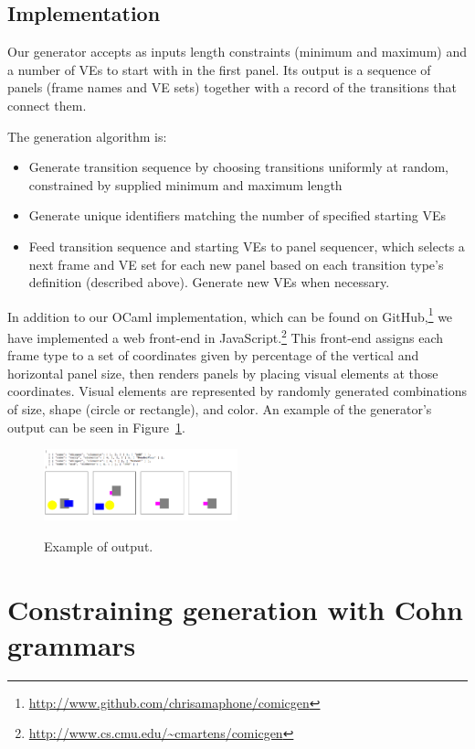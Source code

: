 \subsection{Implementation}

Our generator accepts as inputs length constraints (minimum and maximum)
and a number of VEs to start with in the first panel. Its output is a
sequence of panels (frame names and VE sets) together with a record of the
transitions that connect them.

The generation algorithm is:
\begin{itemize}
\item Generate transition sequence by choosing transitions uniformly at
random, constrained by supplied minimum and maximum length
\item Generate unique identifiers matching the number of specified starting
VEs
\item Feed transition sequence and starting VEs to panel sequencer, which
selects a next frame and VE set for each new panel based on each
transition type's definition (described above). Generate new VEs when
necessary.
\end{itemize}

In addition to our OCaml implementation, which can be found on
GitHub,\footnote{\url{http://www.github.com/chrisamaphone/comicgen}} we
have implemented a web front-end in JavaScript.\footnote{
\url{http://www.cs.cmu.edu/~cmartens/comicgen}} This front-end
assigns each frame type to a set of coordinates given by percentage of the
vertical and horizontal panel size, then renders panels by placing visual
elements at those coordinates. Visual elements are represented by randomly
generated combinations of size, shape (circle or rectangle), and color.
An example of the generator's output can be seen in Figure~\ref{fig:out1}.

\begin{figure}
\caption{Example of output.}
\includegraphics[width=0.5\textwidth]{comicgen-unconstrained-ok.png}
\label{fig:out1}
\end{figure}

\section{Constraining generation with Cohn grammars}

